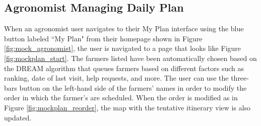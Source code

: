 \newpage
\subsection{Agronomist Managing Daily Plan}
\noindent
When an agronomist user navigates to their My Plan interface using the blue button labeled “My Plan" from their homepage shown in Figure \ref{fig:mock_agronomist}, the user is navigated to a page that looks like Figure \ref{fig:mockplan_start}. The farmers listed have been automatically chosen based on the DREAM algorithm that queues farmers based on different factors such as ranking, date of last visit, help requests, and more. The user can use the three-bars button on the left-hand side of the farmers' names in order to modify the order in which the farmer's are scheduled. When the order is modified as in Figure \ref{fig:mockplan_reorder}, the map with the tentative itinerary view is also updated. 


